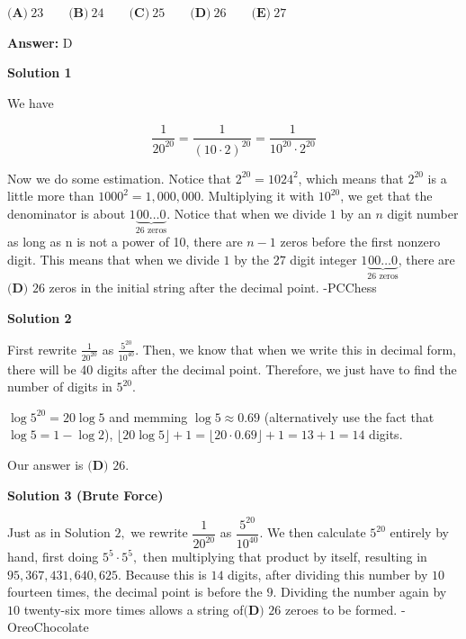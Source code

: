 \begin{enumerate}
 $\textbf{(A)}\ 23 \qquad\textbf{(B)}\ 24 \qquad\textbf{(C)}\  25 \qquad\textbf{(D)}\ 26 \qquad\textbf{(E)}\ 27$

 \textbf{Answer: }D



\textbf{Solution 1}

We have

 
 \[\dfrac{1}{20^{20}} = \dfrac{1}{(10\cdot2)^{20}}=\dfrac{1}{10^{20}\cdot2^{20}}\]

 Now we do some estimation. Notice that $2^{20} = 1024^2$, which means that $2^{20}$ is a little more than $1000^2=1,000,000$. Multiplying it with $10^{20}$, we get that the denominator is about $1\underbrace{00\dots0}_{26 \text{ zeros}}$. Notice that when we divide $1$ by an $n$ digit number as long as n is not a power of 10, there are $n-1$ zeros before the first nonzero digit. This means that when we divide $1$ by the $27$ digit integer $1\underbrace{00\dots0}_{26 \text{ zeros}}$, there are $\boxed{\textbf{(D) } \text{26}}$ zeros in the initial string after the decimal point. -PCChess

 



\textbf{Solution 2}

First rewrite $\frac{1}{20^{20}}$ as $\frac{5^{20}}{10^{40}}$. Then, we know that when we write this in decimal form, there will be 40 digits after the decimal point. Therefore, we just have to find the number of digits in ${5^{20}}$.

 $\log{5^{20}} = 20\log{5}$ and memming $\log{5}\approx0.69$ (alternatively use the fact that $\log{5} = 1 - \log{2}$), $\lfloor{20\log{5}}\rfloor+1=\lfloor{20\cdot0.69}\rfloor+1=13+1=14$ digits. 

 Our answer is $\boxed{\textbf{(D) } \text{26}}$.

 



\textbf{Solution 3 (Brute Force)}

Just as in Solution $2,$ we rewrite $\dfrac{1}{20^{20}}$ as $\dfrac{5^{20}}{10^{40}}.$ We then calculate $5^{20}$ entirely by hand, first doing $5^5 \cdot 5^5,$ then multiplying that product by itself, resulting in $95,367,431,640,625.$ Because this is $14$ digits, after dividing this number by $10$ fourteen times, the decimal point is before the $9.$ Dividing the number again by $10$ twenty-six more times allows a string of$\boxed{\textbf{(D) } \text{26}}$ zeroes to be formed. -OreoChocolate

 




\end{enumerate}

